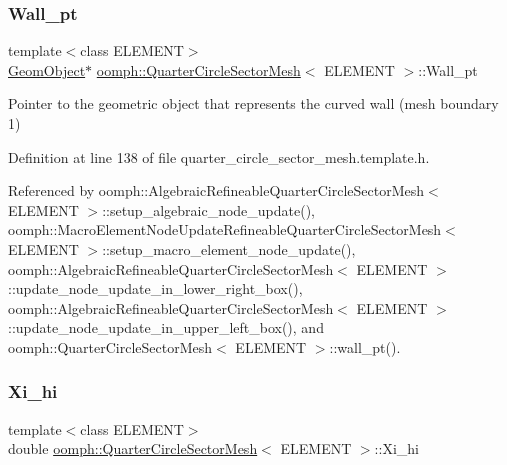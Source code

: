 \subsubsection{\texorpdfstring{Wall\+\_\+pt}{Wall\_pt}}
{\footnotesize\ttfamily template$<$class E\+L\+E\+M\+E\+NT$>$ \\
\hyperlink{classoomph_1_1GeomObject}{Geom\+Object}$\ast$ \hyperlink{classoomph_1_1QuarterCircleSectorMesh}{oomph\+::\+Quarter\+Circle\+Sector\+Mesh}$<$ E\+L\+E\+M\+E\+NT $>$\+::Wall\+\_\+pt\hspace{0.3cm}{\ttfamily [protected]}}



Pointer to the geometric object that represents the curved wall (mesh boundary 1) 



Definition at line 138 of file quarter\+\_\+circle\+\_\+sector\+\_\+mesh.\+template.\+h.



Referenced by oomph\+::\+Algebraic\+Refineable\+Quarter\+Circle\+Sector\+Mesh$<$ E\+L\+E\+M\+E\+N\+T $>$\+::setup\+\_\+algebraic\+\_\+node\+\_\+update(), oomph\+::\+Macro\+Element\+Node\+Update\+Refineable\+Quarter\+Circle\+Sector\+Mesh$<$ E\+L\+E\+M\+E\+N\+T $>$\+::setup\+\_\+macro\+\_\+element\+\_\+node\+\_\+update(), oomph\+::\+Algebraic\+Refineable\+Quarter\+Circle\+Sector\+Mesh$<$ E\+L\+E\+M\+E\+N\+T $>$\+::update\+\_\+node\+\_\+update\+\_\+in\+\_\+lower\+\_\+right\+\_\+box(), oomph\+::\+Algebraic\+Refineable\+Quarter\+Circle\+Sector\+Mesh$<$ E\+L\+E\+M\+E\+N\+T $>$\+::update\+\_\+node\+\_\+update\+\_\+in\+\_\+upper\+\_\+left\+\_\+box(), and oomph\+::\+Quarter\+Circle\+Sector\+Mesh$<$ E\+L\+E\+M\+E\+N\+T $>$\+::wall\+\_\+pt().

\mbox{\label{classoomph_1_1QuarterCircleSectorMesh_a1fa3bfeddd4467e9fe0ec45fbfac0740}} 
\subsubsection{\texorpdfstring{Xi\+\_\+hi}{Xi\_hi}}
{\footnotesize\ttfamily template$<$class E\+L\+E\+M\+E\+NT$>$ \\
double \hyperlink{classoomph_1_1QuarterCircleSectorMesh}{oomph\+::\+Quarter\+Circle\+Sector\+Mesh}$<$ E\+L\+E\+M\+E\+NT $>$\+::Xi\+\_\+hi\hspace{0.3cm}{\ttfamily [protected]}}



